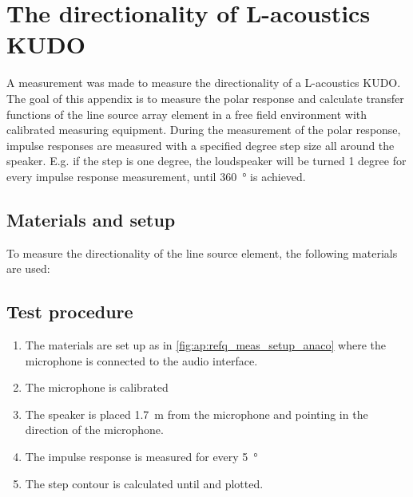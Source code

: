 \chapter{The directionality of L-acoustics KUDO}
A measurement was made to measure the directionality of a L-acoustics KUDO.  The goal of this appendix is to measure the polar response and calculate transfer functions of the line source array element in a free field environment with calibrated measuring equipment. During the measurement of the polar response, impulse responses are measured with a specified degree step size all around the speaker. E.g. if the step is one degree, the loudspeaker will be turned 1 degree for every  impulse response measurement, until \SI{360}{\degree} is achieved.


\section*{Materials and setup}
To measure the directionality of the line source element, the following materials are used:

\startequipment
{}
\stopequipment




\section*{Test procedure}


\begin{enumerate}
\item The materials are set up as in \autoref{fig:ap:refq_meas_setup_anaco} where the  microphone is connected to the audio interface.
\item The microphone is calibrated
\item The speaker is placed \SI{1.7}{\meter} from the microphone and pointing in the direction of the microphone.
\item	The impulse response is measured for every \SI{5}{\degree}
\item The  step contour is calculated until  and plotted.
\end{enumerate}


